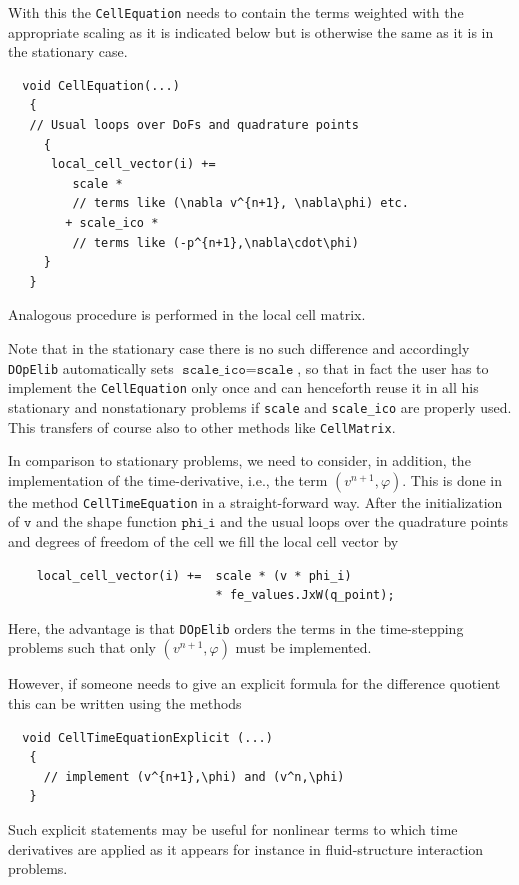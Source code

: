 \documentclass[smallextended]{svjour3}       %
\numberwithin{equation}{section}
\renewcommand{\phi}{\varphi}
\newcommand{\dope}{\texttt{DOpElib}}
\begin{document}
With this the \texttt{CellEquation} needs to contain the terms weighted
with the appropriate scaling as it is indicated below but is otherwise the 
same as it is in the stationary case. 
\begin{lstlisting}
  void CellEquation(...)
   {
   // Usual loops over DoFs and quadrature points
     {
      local_cell_vector(i) += 
         scale * 
         // terms like (\nabla v^{n+1}, \nabla\phi) etc.
        + scale_ico *
         // terms like (-p^{n+1},\nabla\cdot\phi)
     }
   }
\end{lstlisting}
Analogous procedure is performed in the local 
cell matrix.
\begin{remark}
Note that in the stationary case there is no such difference and accordingly 
\dope{} automatically sets $ \texttt{scale\_ico} = \texttt{scale}$, so that in fact the user has to implement the \texttt{CellEquation} only once and can henceforth reuse it in all his stationary and nonstationary problems if 
\texttt{scale} and \texttt{scale\_ico} are properly used. 
This transfers of course also to other methods like \texttt{CellMatrix}.
\end{remark}

In comparison to stationary problems, we need to consider, in addition, 
the implementation
of the time-derivative, i.e., the term $ (v^{n+1},\phi)$. This is done
in the method \texttt{CellTimeEquation} in a straight-forward way. After the initialization of $\texttt{v}$ and the shape function $\texttt{phi\_i}$ and the usual loops over the quadrature points and  degrees of freedom of the cell we fill the local cell vector by
\begin{lstlisting}
    local_cell_vector(i) +=  scale * (v * phi_i)  
                             * fe_values.JxW(q_point);    
\end{lstlisting}
Here, the advantage is that \dope{} orders the terms in the time-stepping
problems
such that only $(v^{n+1},\phi)$ must be implemented. 



\begin{remark}
However, if someone 
needs to give an explicit formula for the difference quotient
this can be written using the methods
\begin{lstlisting}
  void CellTimeEquationExplicit (...)
   {
     // implement (v^{n+1},\phi) and (v^n,\phi)  
   }
\end{lstlisting}
Such explicit statements may be useful for nonlinear terms to which time 
derivatives are applied as it appears for instance in fluid-structure 
interaction problems.
\end{remark}
\end{document}
